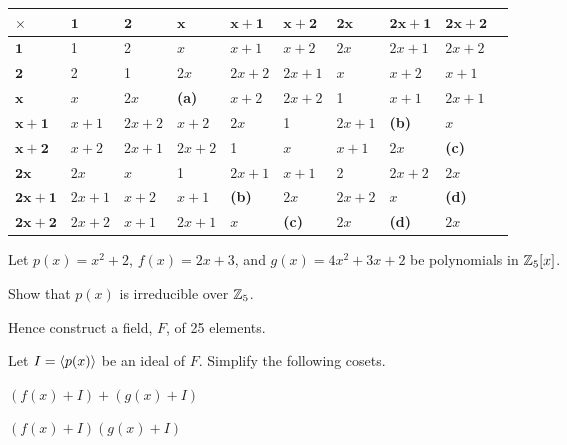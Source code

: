 \begin{example}
    \begin{table}[H]
        \centering
        \begin{tabular}{|l|l|l|l|l|l|l|l|l|l|}
            \hline
            $\boldsymbol{\times}$ & $\boldsymbol{1}$ & $\boldsymbol{2}$ & $\boldsymbol{x}$ & $\boldsymbol{x+1}$ & $\boldsymbol{x+2}$ & $\boldsymbol{2x}$ & $\boldsymbol{2x+1}$ & $\boldsymbol{2x+2}$ \\ \hline
            $\boldsymbol{1}$ & 1 & 2 & $x$ & $x+1$ & $x+2$ & $2x$ & $2x+1$ & $2x+2$ \\ \hline
            $\boldsymbol{2}$ & 2 & 1 & $2x$ & $2x+2$ & $2x+1$ & $x$ & $x+2$ & $x+1$ \\ \hline
            $\boldsymbol{x}$ & $x$ & $2x$ & \textbf{(a)} & $x+2$ & $2x+2$ & 1 & $x+1$ & $2x+1$ \\ \hline
            $\boldsymbol{x+1}$ & $x+1$ & $2x+2$ & $x+2$ & $2x$ & 1 & $2x+1$ & \textbf{(b)} & $x$ \\ \hline
            $\boldsymbol{x+2}$ & $x+2$ & $2x+1$ & $2x+2$ & 1 & $x$ & $x+1$ & $2x$ & \textbf{(c)} \\ \hline
            $\boldsymbol{2x}$ & $2x$ & $x$ & 1 & $2x+1$ & $x+1$ & 2 & $2x+2$ & $2x$ \\ \hline
            $\boldsymbol{2x+1}$ & $2x+1$ & $x+2$ & $x+1$ & \textbf{(b)} & $2x$ & $2x+2$ & $x$ & \textbf{(d)} \\ \hline
            $\boldsymbol{2x+2}$ & $2x+2$ & $x+1$ & $2x+1$ & $x$ & \textbf{(c)} & $2x$ & \textbf{(d)} & $2x$ \\ \hline
        \end{tabular}
    \end{table}

\end{example}

\begin{exercise}
    Let $p(x) = x^2 + 2$, $f(x) = 2x+3$, and $g(x) = 4x^2+3x+2$ be polynomials in $\mathbb{Z}_5[x]$.
    \begin{partquestions}{\roman*}
        \item Show that $p(x)$ is irreducible over $\mathbb{Z}_5$.
        \item Hence construct a field, $F$, of 25 elements.
        \item Let $I = \left\langle p(x)\right\rangle$ be an ideal of $F$.  Simplify the following cosets.
        \begin{partquestions}{\alph*}
            \item $(f(x) + I) + (g(x) + I)$
            \item $(f(x) + I)(g(x) + I)$
        \end{partquestions}
    \end{partquestions}
\end{exercise}

